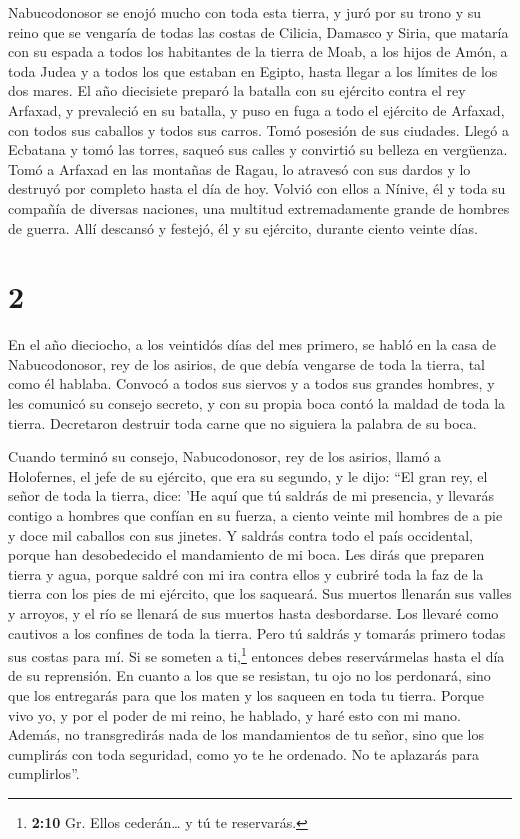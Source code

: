  Nabucodonosor se enojó mucho con toda esta tierra, y
juró por su trono y su reino que se vengaría de todas las costas de
Cilicia, Damasco y Siria, que mataría con su espada a todos los
habitantes de la tierra de Moab, a los hijos de Amón, a toda Judea y a
todos los que estaban en Egipto, hasta llegar a los límites de los dos
mares.  El año diecisiete preparó la batalla con su
ejército contra el rey Arfaxad, y prevaleció en su batalla, y puso en
fuga a todo el ejército de Arfaxad, con todos sus caballos y todos sus
carros.  Tomó posesión de sus ciudades. Llegó a Ecbatana
y tomó las torres, saqueó sus calles y convirtió su belleza en
vergüenza.  Tomó a Arfaxad en las montañas de Ragau, lo
atravesó con sus dardos y lo destruyó por completo hasta el día de hoy.
 Volvió con ellos a Nínive, él y toda su compañía de
diversas naciones, una multitud extremadamente grande de hombres de
guerra. Allí descansó y festejó, él y su ejército, durante ciento veinte
días.

\hypertarget{section-1}{%
\section{2}\label{section-1}}

 En el año dieciocho, a los veintidós días del mes
primero, se habló en la casa de Nabucodonosor, rey de los asirios, de
que debía vengarse de toda la tierra, tal como él hablaba.
 Convocó a todos sus siervos y a todos sus grandes
hombres, y les comunicó su consejo secreto, y con su propia boca contó
la maldad de toda la tierra.  Decretaron destruir toda
carne que no siguiera la palabra de su boca.

 Cuando terminó su consejo, Nabucodonosor, rey de los
asirios, llamó a Holofernes, el jefe de su ejército, que era su segundo,
y le dijo:  ``El gran rey, el señor de toda la tierra,
dice: 'He aquí que tú saldrás de mi presencia, y llevarás contigo a
hombres que confían en su fuerza, a ciento veinte mil hombres de a pie y
doce mil caballos con sus jinetes.  Y saldrás contra todo
el país occidental, porque han desobedecido el mandamiento de mi boca.
 Les dirás que preparen tierra y agua, porque saldré con
mi ira contra ellos y cubriré toda la faz de la tierra con los pies de
mi ejército, que los saqueará.  Sus muertos llenarán sus
valles y arroyos, y el río se llenará de sus muertos hasta desbordarse.
 Los llevaré como cautivos a los confines de toda la
tierra.  Pero tú saldrás y tomarás primero todas sus
costas para mí. Si se someten a ti,\footnote{\textbf{2:10} Gr. Ellos
  cederán\ldots{} y tú te reservarás.} entonces debes reservármelas
hasta el día de su reprensión.  En cuanto a los que se
resistan, tu ojo no los perdonará, sino que los entregarás para que los
maten y los saqueen en toda tu tierra.  Porque vivo yo, y
por el poder de mi reino, he hablado, y haré esto con mi mano.
 Además, no transgredirás nada de los mandamientos de tu
señor, sino que los cumplirás con toda seguridad, como yo te he
ordenado. No te aplazarás para cumplirlos''.


